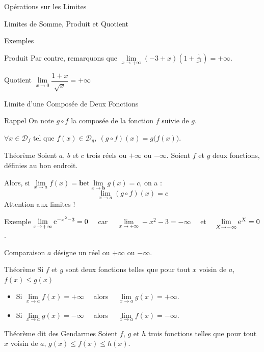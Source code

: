 \documentclass{coursbook}
\begin{document}
\begin{Gpartie}{Opérations sur les Limites}
\begin{Spartie}{Limites de Somme, Produit et Quotient}
\begin{SSpartie}{Exemples}
\begin{SSSpartie}{Produit}
                    Par contre, remarquons que $\lim\limits_{x\to+\infty}\left(-3+x\right)\left(1+\frac{1}{x^2}\right)=+\infty$.
                \end{SSSpartie}
                \begin{SSSpartie}{Quotient} 
                    $\lim\limits_{x\to0}\dfrac{1+x}{\sqrt{x}}=+\infty$
                \end{SSSpartie}
            \end{SSpartie}
        \end{Spartie}
        \begin{Spartie}{Limite d'une Composée de Deux Fonctions} 
            \begin{SSpartie}{Rappel} 
                On note $g\circ f$ la composée de la fonction $f$ suivie de $g$.

                $\forall x\in\mathcal{D}_f$ tel que $f(x)\in\mathcal{D}_g,~(g\circ f)(x)=g\big(f(x)\big)$.
            \end{SSpartie}
            \begin{SSpartie}{Théorème} 
                Soient $a$, $b$ et $c$ trois réels ou $+\infty$ ou $-\infty$. Soient $f$ et $g$ deux fonctions, définies au bon endroit. 
                
                Alors, si $\lim\limits_{x\to a}f(x)=\boldsymbol{b}$\quad et\quad$\lim\limits_{x\to\boldsymbol{b}}g(x)=c$, on a : \[\lim\limits_{x\to a}(g\circ f)(x)=c\]
                Attention aux limites !
            \end{SSpartie}
            \begin{SSpartie}{Exemple} 
                $\lim\limits_{x\to+\infty}\mathrm{e}^{-x^2-3}=0\quad$ car $\quad\lim\limits_{x\to+\infty}-x^2-3=-\infty\quad$ et $\quad\lim\limits_{X\to-\infty}\mathrm{e}^X=0$.
            \end{SSpartie}
        \end{Spartie}
        \begin{Spartie}{Comparaison} 
            $a$ désigne un réel ou $+\infty$ ou $-\infty$.
            \begin{SSpartie}{Théorème} 
                Si $f$ et $g$ sont deux fonctions telles que pour tout $x$ voisin de $a$, $f(x)\leq g(x)$
                \begin{itemize}
                    \item Si $\lim\limits_{x\to a}f(x)=+\infty\quad$ alors $\quad\lim\limits_{x\to a}g(x)=+\infty$.
                    \item Si $\lim\limits_{x\to a}g(x)=-\infty\quad$ alors $\quad\lim\limits_{x\to a}f(x)=-\infty$.
                \end{itemize}
            \end{SSpartie}
            \begin{SSpartie}{Théorème dit \og des Gendarmes \fg{}} 
                Soient $f$, $g$ et $h$ trois fonctions telles que pour tout $x$ voisin de $a$, $g(x)\leq f(x)\leq h(x)$.


\end{SSpartie}
\end{Spartie}
\end{Gpartie}
\end{document}
